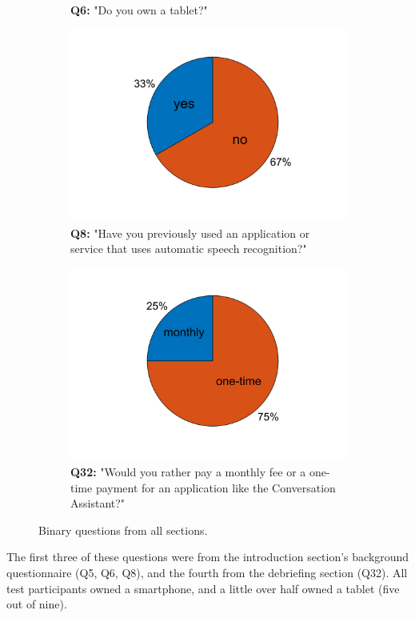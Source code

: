 \documentclass[english, 12pt, a4paper, pdftex, elec, utf8]{aaltothesis}
\begin{document}
\begin{figure}[b]
\begin{subfigure}[b]{0.45\textwidth}
		\caption*{\textbf{Q6:} "Do you own a tablet?" \vspace{2mm}}
	\end{subfigure}
	\begin{subfigure}[b]{0.45\textwidth}
		\includegraphics[width=\textwidth, trim={1.5cm 0.6cm 1.5cm 0.2cm}, clip]{T1_3.png}
		\caption*{\textbf{Q8:} "Have you previously used an application or service that uses automatic speech recognition?"} 
	\end{subfigure} \hspace{5mm}
	\begin{subfigure}[b]{0.45\textwidth}
		\includegraphics[width=\textwidth, trim={1.5cm 0.6cm 1.5cm 0.2cm}, clip]{T1_4.png}
		\caption*{\textbf{Q32:} "Would you rather pay a monthly fee or a one-time payment for an application like the Conversation Assistant?"} 
	\end{subfigure}
	\vspace{4mm}
	\caption{Binary questions from all sections.}
	\label{fig:results_pie} 
\end{figure}
The first three of these questions were from the introduction section's background questionnaire (Q5, Q6, Q8), and the fourth from the debriefing section (Q32). All test participants owned a smartphone, and a little over half owned a tablet (five out of nine).
\end{document}
